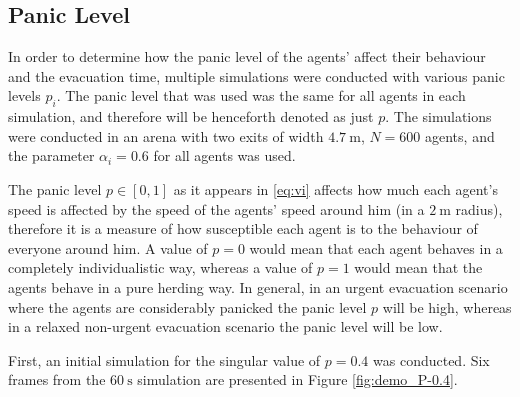 \subsection{Panic Level} \label{sec:6.2-panic}
In order to determine how the panic level of the agents' affect their behaviour and the evacuation time, multiple simulations were conducted with various panic levels $p_i$. The panic level that was used was the same for all agents in each simulation, and therefore will be henceforth denoted as just $p$. The simulations were conducted in an arena with two exits of width $\SI{4.7}{\meter}$, $N=600$ agents, and the parameter $\alpha_i=0.6$ for all agents was used.

The panic level $p \in [0,1]$ as it appears in \eqref{eq:vi} affects how much each agent's speed is affected by the speed of the agents' speed around him (in a $\SI{2}{\meter}$ radius), therefore it is a measure of how susceptible each agent is to the behaviour of everyone around him. A value of $p=0$ would mean that each agent behaves in a completely individualistic way, whereas a value of $p=1$ would mean that the agents behave in a pure herding way. In general, in an urgent evacuation scenario where the agents are considerably panicked the panic level $p$ will be high, whereas in a relaxed non-urgent evacuation scenario the panic level will be low.

First, an initial simulation for the singular value of $p = 0.4$ was conducted. Six frames from the $\SI{60}{\second}$ simulation are presented in Figure \ref{fig:demo_P-0.4}.

